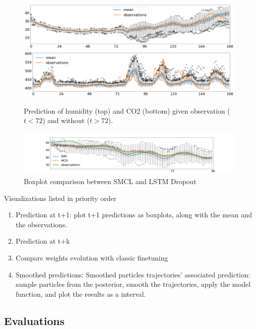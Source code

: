 \documentclass{article}
\begin{document}
\begin{figure}[htpb]
	\centering
	\includegraphics[width=\linewidth]{filter_kp24_hum.png}
	\includegraphics[width=\linewidth]{filter_kp24_co2.png}
	\caption{Prediction of humidity (top) and CO2 (bottom) given observation ($t<72$) and without ($t > 72$).}%
	\label{fig:filter_k+24}
\end{figure}

\begin{figure}[htpb]
	\centering
	\includegraphics[width=\linewidth]{boxplot_comparison.png}
	\caption{Boxplot comparison between SMCL and LSTM Dropout}%
	\label{fig:boxplot_comparison}
\end{figure}

Visualizations listed in priority order
\begin{enumerate}
	\item Prediction at t+1: plot t+1 predictions as boxplots, along with the mean and the observations.
	\item Prediction at t+k
	\item Compare weights evolution with classic finetuning
	\item Smoothed predictions: Smoothed particles trajectories' associated prediction: sample particles from the posterior, smooth the trajectories, apply the model function, and plot the results as a interval.
\end{enumerate}

\subsection{Evaluations}%
\label{sub:evaluations}
\end{document}
